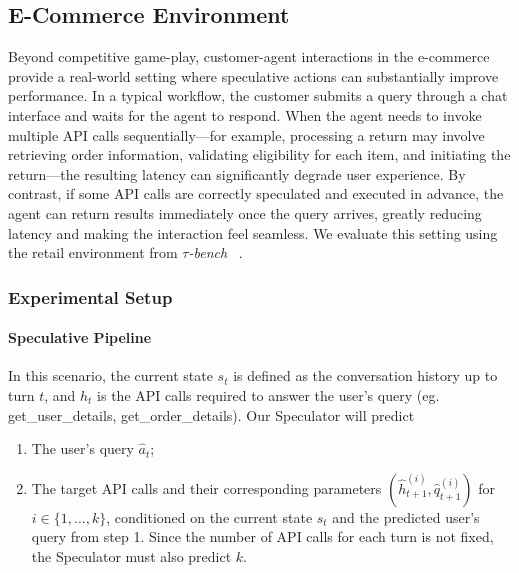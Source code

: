 \subsection{E-Commerce Environment}
\label{subsec:ecommerce}
Beyond competitive game-play, customer-agent interactions in the e-commerce provide a real-world setting where speculative actions can substantially improve performance. In a typical workflow, the customer submits a query through a chat interface and waits for the agent to respond. When the agent needs to invoke multiple API calls sequentially—for example, processing a return may involve retrieving order information, validating eligibility for each item, and initiating the return—the resulting latency can significantly degrade user experience. By contrast, if some API calls are correctly speculated and executed in advance, the agent can return results immediately once the query arrives, greatly reducing latency and making the interaction feel seamless. We evaluate this setting using the retail environment from  \emph{$\tau$-bench} ~\cite{yao_Taubench_2024}.

\subsubsection{Experimental Setup}
\paragraph{Speculative Pipeline} 
In this scenario, the current state $s_t$ is defined as the conversation history up to turn $t$, and $h_t$ is the API calls required to answer the user's query (eg. get\_user\_details, get\_order\_details). Our Speculator will predict
\begin{enumerate}
    \item The user’s query $\hat{a}_t$;
    \item The target API calls and their corresponding parameters $(\hat{h}_{t+1}^{(i)}, \hat{q}_{t+1}^{(i)})$ for $i \in \{1, ..., k\}$, conditioned on the current state $s_t$ and the predicted user's query from step 1. Since the number of API calls for each turn is not fixed, the Speculator must also predict $k$.
\end{enumerate}

